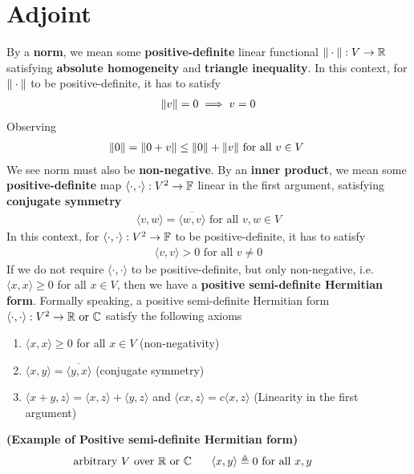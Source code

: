 \documentclass{report}
\begin{document}
\section{Adjoint}
\begin{mdframed}
  By a \textbf{norm}, we mean some \textbf{positive-definite} linear functional $\| \cdot \|:V\to \mathbb{R}$ satisfying \textbf{absolute homogeneity} and \textbf{triangle inequality}. In this context, for $\| \cdot \|$ to be positive-definite, it has to satisfy 
\begin{align*}
  \| v \|=0 \implies  v=0
\end{align*}
Observing 
\begin{align*}
\| 0 \|=\| 0+v \|\leq \| 0 \|+\| v \|\text{ for all $v\in V$ }
\end{align*}
We see norm must also be \textbf{non-negative}. By an \textbf{inner product}, we mean some \textbf{positive-definite}  map $\langle \cdot,\cdot\rangle : V^2 \rightarrow \mathbb{F}$ linear in the first argument, satisfying \textbf{conjugate symmetry}
\begin{align*}
\langle v,w\rangle = \overline{\langle w,v\rangle }\text{ for all }v,w \in V
\end{align*}
In this context, for $\langle \cdot,\cdot\rangle :V^2\rightarrow \mathbb{F}$ to be positive-definite, it has to satisfy 
\begin{align*}
\langle v,v\rangle >0 \text{ for all }v\neq 0
\end{align*}
If we do not require $\langle \cdot,\cdot\rangle $ to be positive-definite, but only non-negative, i.e. $\langle x,x\rangle \geq 0$ for all $x\in V$, then we have a \textbf{positive semi-definite Hermitian form}. Formally speaking, a positive semi-definite Hermitian form $\langle\cdot,\cdot \rangle :V^2 \rightarrow \mathbb{R}\text{ or }\mathbb{C}$ satisfy the following axioms
\begin{enumerate}[label=(\alph*)]
  \item $\langle x,x\rangle \geq 0$ for all $x\in V$ (non-negativity)
  \item $\langle x,y\rangle =\overline{\langle y,x\rangle }$ (conjugate symmetry)
  \item $\langle x+y,z\rangle =\langle x,z\rangle +\langle y,z\rangle $ and $\langle cx,z\rangle=c\langle x,z\rangle $ (Linearity in the first argument)
\end{enumerate}
\begin{Example}{\textbf{(Example of Positive semi-definite Hermitian form)}}{}
\begin{align*}
\text{ arbitrary }V\text{ over $\mathbb{R}$ or  $\mathbb{C}$ }\hspace{0.5cm}\langle x,y\rangle \triangleq 0\text{ for all $x,y$ }\hspace{1cm}
\end{align*}
\end{Example}
\end{mdframed}
\end{document}

